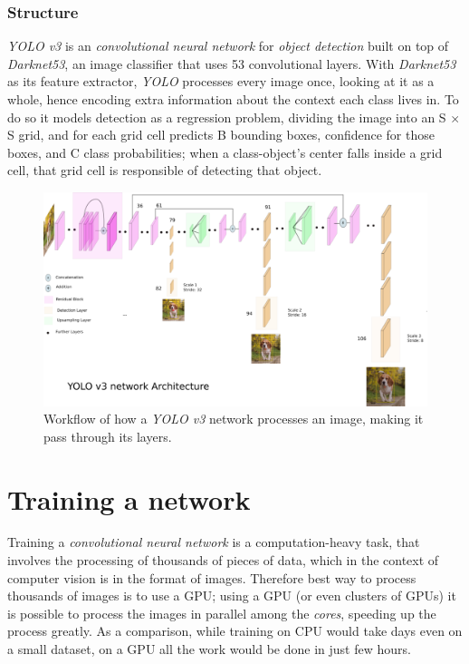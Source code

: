 	\subsubsection{Structure}
	\emph{YOLO v3} is an \emph{convolutional neural network} for \emph{object detection} built on top of \emph{Darknet53}, an image classifier that uses 53 convolutional layers. With \emph{Darknet53} as its feature extractor, \emph{YOLO}  processes every image once, looking at it as a whole, hence encoding extra information about the context each class lives in. To do so it models detection as a regression
problem, dividing the image into an S $\times$ S grid, and for each grid cell predicts B bounding boxes, confidence for those boxes, and C class probabilities; when a class-object's center falls inside a grid cell, that grid cell is responsible of detecting that object.
	

\begin{figure}[htbp]
\begin{center}
\includegraphics[width=\textwidth]{immagini/pictures/yoloworkflow.png} 
\caption{Workflow of how a \emph{YOLO v3} network processes an image, making it pass through its layers.}
\end{center}
\end{figure}
	
\section{Training a network}
	Training a \emph{convolutional neural network} is a computation-heavy task, that involves the processing of thousands of pieces of data, which in the context of computer vision is in the format of images. Therefore best way to process thousands of images is to use a GPU; using a GPU (or even clusters of GPUs) it is possible to process the images in parallel among the \emph{cores}, speeding up the process greatly. As a comparison, while training on CPU would take days even on a small dataset, on a GPU all the work would be done in just few hours.
	
